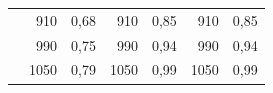 \begin{longtable}[c]{c|rr|rr|rr|}
	& \multicolumn{1}{r|}{910}   & 0,68               & \multicolumn{1}{r|}{910}   & 0,85               & \multicolumn{1}{r|}{910}   & 0,85               \\ \cline{2-7} 
	& \multicolumn{1}{r|}{990}   & 0,75               & \multicolumn{1}{r|}{990}   & 0,94               & \multicolumn{1}{r|}{990}   & 0,94               \\ \cline{2-7} 
	& \multicolumn{1}{r|}{1050}  & 0,79               & \multicolumn{1}{r|}{1050}  & 0,99               & \multicolumn{1}{r|}{1050}  & 0,99               \\ \cline{2-7} 
\end{longtable}

%
%
%
